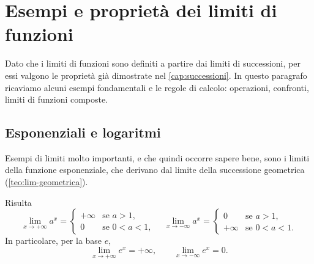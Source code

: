 \section{Esempi e proprietà dei limiti di funzioni}
\label{sec:proprieta-limiti-funzioni}

Dato che i limiti di funzioni sono definiti a partire dai limiti di successioni, per
essi valgono le proprietà già dimostrate nel \cref{cap:successioni}. In questo paragrafo
ricaviamo alcuni esempi fondamentali e le regole di calcolo: operazioni, confronti,
limiti di funzioni composte.

\subsection{Esponenziali e logaritmi}

Esempi di limiti molto importanti, e che quindi occorre sapere bene, sono i limiti della
funzione esponenziale, che derivano dal limite della successione geometrica
(\cref{teo:lim-geometrica}).

\begin{proposizione}\label{prop:lim-esponenziale}
Risulta
\begin{equation}\label{eq:lim-esponenziale}
  \lim_{x\to+\infty}a^{x}=
  \begin{cases}
    +\infty & \text{se } a>1,\\
    0 & \text{se } 0<a<1,
  \end{cases}
  \quad
  \lim_{x\to-\infty}a^{x}=
  \begin{cases}
    0 & \text{se } a>1,\\
    +\infty & \text{se } 0<a<1.
  \end{cases}
\end{equation}
In particolare, per la base $e$,
\begin{equation}\label{eq:lim-e-x}
  \lim_{x\to+\infty}e^{x}=+\infty, \qquad \lim_{x\to-\infty}e^{x}=0 .
\end{equation}
\end{proposizione}

\begin{schema}
\end{schema}

